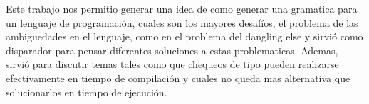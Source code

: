 Este trabajo nos permitio generar una idea de como generar una gramatica para un lenguaje de programación, cuales son los mayores desafíos, el problema de las ambiguedades en el lenguaje, como en el problema del dangling else y sirvió como disparador para pensar diferentes soluciones a estas problematicas. Ademas, sirvió para discutir temas tales como que chequeos de tipo pueden realizarse efectivamente en tiempo de compilación y cuales no queda mas alternativa que solucionarlos en tiempo de ejecución.